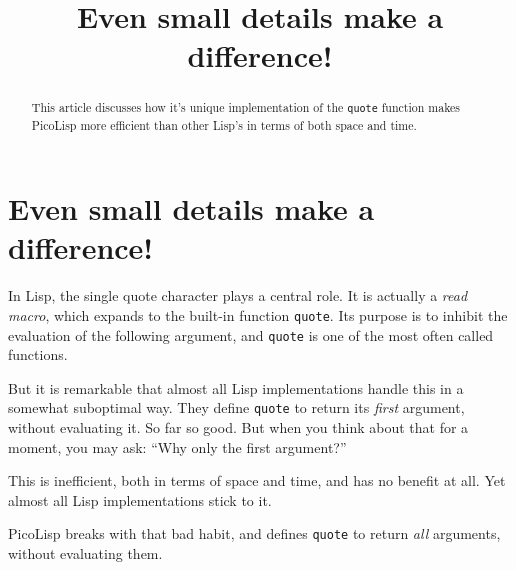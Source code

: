 \title{Even small details make a difference!}

\maketitle






% 

\begin{abstract}
  This article discusses how it's unique implementation of the
  \texttt{quote} function makes PicoLisp more efficient than other
  Lisp's in terms of both space and time. 
\end{abstract}

\section{Even small details make a difference!}
\label{sec:quote-small-details}

In Lisp, the single quote character plays a central role. It is actually a
\textit{read macro}, which expands to the built-in function \texttt{quote}. Its purpose is
to inhibit the evaluation of the following argument, and \texttt{quote} is one of the
most often called functions.

But it is remarkable that almost all Lisp implementations handle this in a
somewhat suboptimal way. They define \texttt{quote} to return its \textit{first} argument,
without evaluating it. So far so good. But when you think about that for a
moment, you may ask: ``Why only the first argument?''

This is inefficient, both in terms of space and time, and has no benefit at all.
Yet almost all Lisp implementations stick to it.

PicoLisp breaks with that bad habit, and defines \texttt{quote} to return \textit{all}
arguments, without evaluating them.

